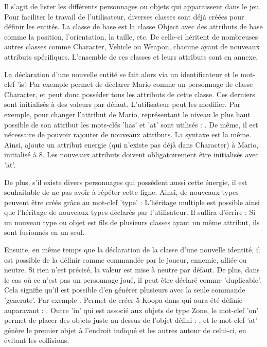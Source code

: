 Il s'agit de lister les différents personnages ou objets qui apparaissent dans le jeu.
Pour faciliter le travail de l'utilisateur, diverses classes sont déjà créées pour définir les entités.
La classe de base est la classe Object avec des attributs de base comme la position, l'orientation, la taille, etc.
De celle-ci héritent de nombreuses autres classes comme Character, Vehicle ou Weapon, chacune ayant de nouveaux attributs spécifiques.
L'ensemble de ces classes et leurs attributs sont en annexe.

La déclaration d'une nouvelle entité se fait alors via un identificateur et le mot-clef 'is'.
Par exemple  permet de déclarer Mario comme un personnage de classe Character, 
et peut donc posséder tous les attributs de cette classe. Ces derniers sont initialisés à des valeurs par défaut.
L'utilisateur peut les modifier. Par exemple, pour changer l'attribut  de Mario, 
représentant le niveau le plus haut possible de son attribut  les mots-clés 'has' et 'at' sont utilisés : 
.
De même, il est nécessaire de pouvoir rajouter de nouveaux attributs.
La syntaxe est la même. Ainsi,  ajoute un attribut energie (qui n'existe pas déjà dans Character) à Mario,
 initialisé à 8.
Les nouveaux attributs doivent obligatoirement être initialisés avec 'at'.

De plus, s'il existe divers personnages qui possèdent aussi cette énergie, il est souhaitable de ne pas avoir à répéter cette ligne.
Ainsi, de nouveaux types peuvent être créés grâce au mot-clef 'type' :
L'héritage multiple est possible ainsi que l'héritage de nouveaux types déclarés par l'utilisateur. Il suffira d'écrire :
 
Si un nouveau type ou objet est fils de plusieurs classes ayant un même attribut, ils sont fusionnés en un seul.

Ensuite, en même temps que la déclaration de la classe d'une nouvelle identité, il est possible de la définir comme commandée par le joueur, ennemie, alliée ou neutre.
Si rien n'est précisé, la valeur est mise à neutre par défaut.
 
De plus, dans le cas où ce n'est pas un personnage joué, il peut être déclaré comme 'duplicable'.
Cela signifie qu'il est possible d'en générer plusieurs avec la seule commande 'generate'.
Par exemple  . 
Permet de créer 5 Koopa dans  qui aura été définie auparavant : . 
Outre 'in' qui est associé aux objets de type Zone, le mot-clef 'on' permet de placer 
des objets juste au-dessus de l'objet défini : , et le mot-clef 'at' génère
le premier objet à l'endroit indiqué et les autres autour de celui-ci, en évitant les collisions.

